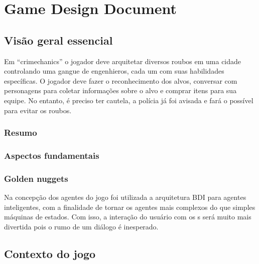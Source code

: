 \chapter{Game Design Document}\label{ap:gdd}


\section{Visão geral essencial}
Em ``crimechanics'' o jogador deve arquitetar diversos roubos em uma cidade controlando uma gangue de engenhieros, cada um com suas habilidades específicas. O jogador deve fazer o reconhecimento dos alvos, conversar com personagens para coletar informações sobre o alvo e comprar itens para sua equipe. No entanto, é preciso ter cautela, a polícia já foi avisada e fará o possível para evitar os roubos.

\subsection{Resumo}
\subsection{Aspectos fundamentais}
\subsection{Golden nuggets}
Na concepção dos agentes do jogo foi utilizada a arquitetura BDI para agentes inteligentes, com a finalidade de tornar os agentes mais complexos do que simples máquinas de estados. Com isso, a interação do usuário com os \npc{}s será muito mais divertida pois o rumo de um diálogo é inesperado.

\section{Contexto do jogo}
